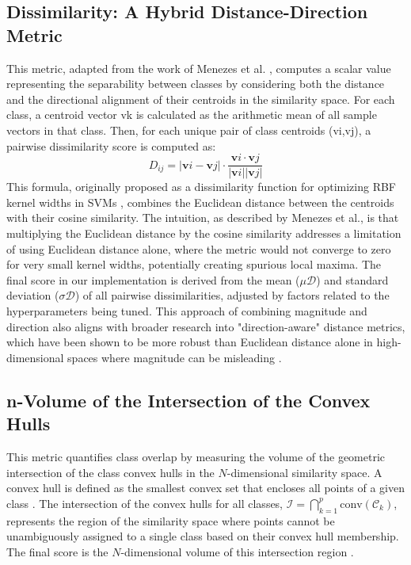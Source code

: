 \documentclass[conference]{IEEEtran}
\begin{document}
\subsection{Dissimilarity: A Hybrid Distance-Direction Metric}
This metric, adapted from the work of Menezes et al. \cite{b72}, computes a scalar value representing the separability between classes by considering both the distance and the directional alignment of their centroids in the similarity space. For each class, a centroid vector vk is calculated as the arithmetic mean of all sample vectors in that class. Then, for each unique pair of class centroids (vi,vj), a pairwise dissimilarity score is computed as:
\begin{equation}
D_{ij} = |\mathbf{v}i - \mathbf{v}j|
\cdot \frac{\mathbf{v}i \cdot \mathbf{v}j}{|\mathbf{v}i| |\mathbf{v}j|}
\end{equation}
This formula, originally proposed as a dissimilarity function for optimizing RBF kernel widths in SVMs \cite{b72}, combines the Euclidean distance between the centroids with their cosine similarity. The intuition, as described by Menezes et al., is that multiplying the Euclidean distance by the cosine similarity addresses a limitation of using Euclidean distance alone, where the metric would not converge to zero for very small kernel widths, potentially creating spurious local maxima. The final score in our implementation is derived from the mean ($\mu{\mathcal{D}}$) and standard deviation ($\sigma{\mathcal{D}}$) of all pairwise dissimilarities, adjusted by factors related to the hyperparameters being tuned. This approach of combining magnitude and direction also aligns with broader research into "direction-aware" distance metrics, which have been shown to be more robust than Euclidean distance alone in high-dimensional spaces where magnitude can be misleading \cite{b23, b24, b25}.

\subsection{n-Volume of the Intersection of the Convex Hulls}
This metric quantifies class overlap by measuring the volume of the geometric intersection of the class convex hulls in the $N$-dimensional similarity space. A convex hull is defined as the smallest convex set that encloses all points of a given class \cite{b26}. The intersection of the convex hulls for all classes, $\mathcal{I} = \bigcap_{k=1}^{p} \text{conv}(\mathcal{C}_k)$, represents the region of the similarity space where points cannot be unambiguously assigned to a single class based on their convex hull membership. The final score is the $N$-dimensional volume of this intersection region \cite{b20}.
\end{document}
